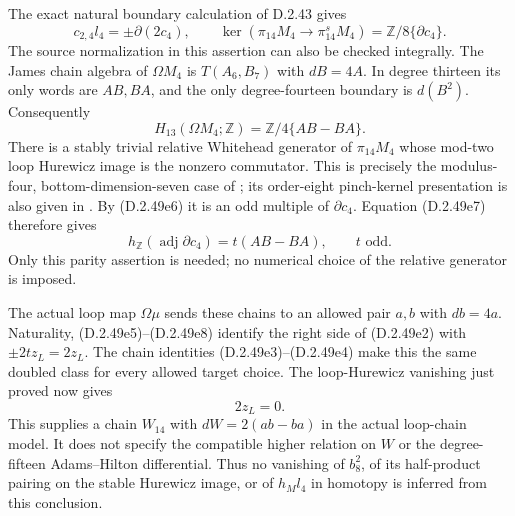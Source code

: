 The exact natural boundary calculation of D.2.43 gives
\[
 c_{2,4}l_4=\pm\partial(2c_4),\qquad
 \ker(\pi_{14}M_4\to\pi_{14}^{s}M_4)
           =\mathbb Z/8\{\partial c_4\}.
 \tag{D.2.49e6}
\]
The source normalization in this assertion can also be checked
integrally.  The James chain algebra of $\Omega M_4$ is
$T(A_6,B_7)$ with $dB=4A$.  In degree thirteen its only words
are $AB,BA$, and the only degree-fourteen boundary is $d(B^2)$.
Consequently
\[
 H_{13}(\Omega M_4;\mathbb Z)
                    =\mathbb Z/4\{AB-BA\}.
 \tag{D.2.49e7}
\]
There is a stably trivial relative Whitehead generator of
$\pi_{14}M_4$ whose mod-two loop Hurewicz image is the nonzero
commutator.  This is precisely the modulus-four,
bottom-dimension-seven case of
\cite[Theorem~1.7(ii)--(iii), Corollary~1.8, and proof,
pp.~6--9]{EH5ZhuPanComplexes2026}; its order-eight
pinch-kernel presentation is also given in
\cite[Lemma~2.2, p.~6]{EH5ZhuPanClassification2026}.
By \textup{(D.2.49e6)} it is an odd multiple of $\partial c_4$.
Equation \textup{(D.2.49e7)} therefore gives
\[
 h_{\mathbb Z}(\operatorname{adj}\partial c_4)
                  =t(AB-BA),\qquad t\text{ odd}.
 \tag{D.2.49e8}
\]
Only this parity assertion is needed; no numerical choice of
the relative generator is imposed.

The actual loop map $\Omega\mu$ sends these chains to an
allowed pair $a,b$ with $db=4a$.  Naturality,
\textup{(D.2.49e5)}--\textup{(D.2.49e8)} identify the
right side of \textup{(D.2.49e2)} with $\pm2t z_L=2z_L$.
The chain identities \textup{(D.2.49e3)}--\textup{(D.2.49e4)}
make this the same doubled class for every allowed target
choice.  The loop-Hurewicz vanishing just proved now gives
\[
                              2z_L=0.
 \tag{D.2.49e9}
\]
This supplies a chain $W_{14}$ with $dW=2(ab-ba)$ in the
actual loop-chain model.  It does not specify the compatible
higher relation on $W$ or the degree-fifteen Adams--Hilton
differential.  Thus no vanishing of $b_8^2$, of its half-product
pairing on the stable Hurewicz image, or of $h_Ml_4$ in
homotopy is inferred from this conclusion.
